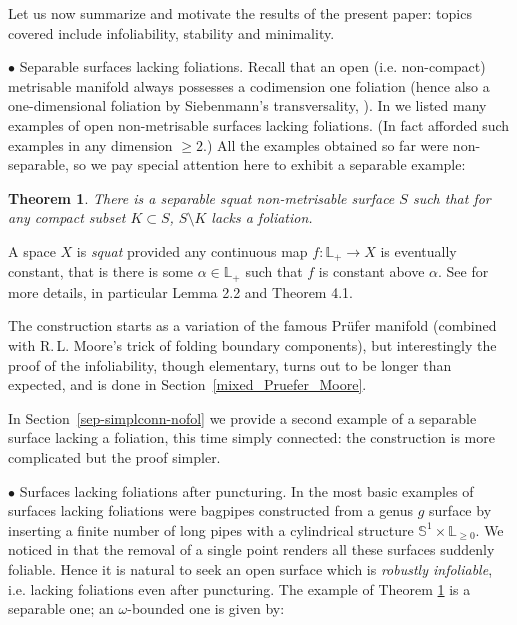 \documentclass{amsart}
\newtheorem{theorem}{Theorem}[section]
\begin{document}
\medskip
Let us now summarize and motivate the results of the present paper: topics covered include infoliability, stability and minimality.

\medskip
\noindent$\bullet$ {\sc Separable surfaces lacking foliations.} 
Recall that an open (i.e. non-compact) metrisable manifold always possesses a codimension one foliation (hence also a one-dimensional foliation by Siebenmann's transversality, \cite{Siebenmann72}). In \cite[Corollary~1.3]{BGG} we listed many examples of open non-metrisable surfaces lacking foliations. (In fact \cite[Corollary~6.5]{BGG1} afforded such examples in any dimension $\ge 2$.) All the examples obtained so far were non-separable, so we pay special attention here to exhibit a separable example:

\begin{theorem}\label{thmsepnonfol}
  There is a separable squat non-metrisable surface $S$ such that for any compact subset $K\subset S$, $S\setminus K$ lacks a foliation.
\end{theorem}

A space $X$ is {\em squat} provided any continuous map $f:{\mathbb{L}}_+\to X$ is eventually constant, that is
there is some $\alpha\in{\mathbb{L}}_+$ such that $f$ is constant above $\alpha$. See \cite{BGG} for more details, in particular Lemma 2.2 and Theorem 4.1.

The construction starts as a variation of the famous Pr\"ufer manifold (combined with R.\,L. Moore's trick of folding boundary components), but interestingly the proof of the infoliability, though elementary, turns out to be longer than expected, and is done in Section~\ref{mixed_Pruefer_Moore}.

In Section~\ref{sep-simplconn-nofol} we provide a second example of a separable surface lacking a foliation, this time simply connected: the construction is more complicated but the proof simpler.

\medskip
\noindent$\bullet$ {\sc Surfaces lacking foliations after puncturing.} In \cite{BGG} the most basic examples of surfaces lacking foliations were bagpipes constructed from a genus $g$ surface by inserting a finite number of long pipes with a cylindrical structure ${\mathbb S}^1\times {\mathbb L}_{\ge0}$. We noticed in \cite[Proposition~6.2]{BGG1} that the removal of a single point renders all these surfaces suddenly foliable. Hence it is natural to seek an open surface which is \emph{robustly infoliable}, i.e. lacking foliations even after puncturing.  The example of Theorem \ref{thmsepnonfol} is a separable one; an $\omega$-bounded one is given by:
\end{document}
